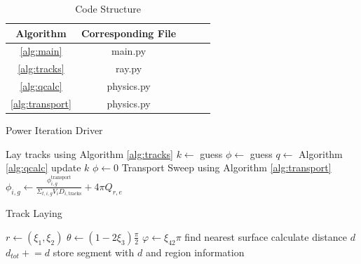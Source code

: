 \documentclass[10pt,letter]{article}
\newcommand{\pluseq}{\mathrel{+}=}
\begin{document}
\begin{table}[h]
\begin{center}
\caption{Code Structure} \label{tab:fourfactors}
\begin{tabular}{ |c|c|c|c|c| } 
\hline
Algorithm & Corresponding File\\ 
\hline
\ref{alg:main} & {main.py} \\
\hline
\ref{alg:tracks} &{ray.py} \\
\hline
\ref{alg:qcalc} & {physics.py} \\
\hline
\ref{alg:transport} & {physics.py} \\
\hline
\end{tabular}
\end{center}
\end{table}

\begin{algorithm}
    \caption{Power Iteration Driver}\label{alg:main}
    \begin{algorithmic}[1]
        \State Lay tracks using Algorithm \ref{alg:tracks}
        \State $k \gets $ guess
        \State $\phi \gets $ guess
        \State $q \gets$ Algorithm \ref{alg:qcalc}
        \State update $k$
        \State  $\phi \gets 0$
        \State  Transport Sweep using Algorithm \ref{alg:transport}
        \State $\phi_{i,g}\gets \frac{\phi_{i,g}^{\text{transport}}}{\Sigma_{t,i,g} V_{i} D_{i,\text{tracks}}} + 4\pi Q_{r,e}$  
        \EndFor
        \EndFor
        \EndWhile
    \end{algorithmic}
\end{algorithm}

\begin{algorithm}
    \caption{Track Laying}\label{alg:tracks}
    \begin{algorithmic}[1]
        \State $r\gets (\xi_1,\xi_2)$
        \State $\theta \gets (1-2\xi_3)\frac{\pi}{2} $
        \State $\varphi \gets \xi_42\pi $
        \State find nearest surface
        \State calculate distance $d$
        \State $d_{tot} \pluseq d$
        \State store segment with $d$ and region information
        \EndIf
        \EndWhile\label{euclidendwhile}
        \EndFor
    \end{algorithmic}
\end{algorithm}
\end{document}
